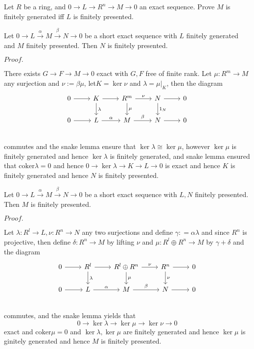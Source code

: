 \documentclass{article}
\newcommand{\Pf}[1]{$Proof.$\par}
\begin{document}
    \begin{proposition}
        Let $R$ be a ring, and $0\to L \to R^n\to M \to 0$ an exact sequence. Prove $M$ is finitely generated iff $L$ is finitely presented.    
    \end{proposition}
    
    \begin{proposition}
        Let $0\to L \overset{\alpha}{\to} M \overset{\beta}{\to} N \to 0$ be a short exact sequence with $L$ finitely generated and $M$ finitely presented. Then $N$ is finitely presented.
    \end{proposition}
    \Pf\par
        There exists $G\to F \to M \to 0$ exact with $G,F$ free of finite rank. Let $\mu:R^m \to M$ any surjection and $\nu:= \beta\mu$, let$K = \ker \nu$ and $\lambda = \mu|_K$, then the diagram
        \[
        \begin{tikzcd}
            0\arrow[r] & K\arrow[r]\arrow[d,"\lambda"] & R^m\arrow[r,"\nu"]\arrow[d,"\mu"] & N\arrow[r]\arrow[d,"1_N"] & 0 \\
            0\arrow[r] & L\arrow[r,"\alpha"] & M\arrow[r,"\beta"] & N\arrow[r] & 0 \\
        \end{tikzcd}
        \]
        commutes and the snake lemma ensure that $\ker\lambda \cong \ker\mu$, however $\ker\mu$ is finitely generated and hence $\ker\lambda$ is finitely generated, and snake lemma ensured that $\text{coker}\lambda = 0$ and hence $0\to \ker\lambda \to K \to L \to 0$ is exact and hence $K$ is finitely generated and hence $N$ is finitely presented.

    \begin{proposition}
        Let $0\to L \overset{\alpha}{\to} M \overset{\beta}{\to} N \to 0$ be a short exact sequence with $L,N$ finitely presented. Then $M$ is finitely presented.
    \end{proposition}
    \Pf\par
        Let $\lambda:R^l \to L, \nu:R^n \to N$ any two surjections and define $\gamma: = \alpha\lambda$ and since $R^n$ is projective, then define $\delta:R^n \to M$ by lifting $\nu$ and $\mu:R^l\oplus R^n \to M$ by $\gamma+\delta$ and the diagram
        \[
        \begin{tikzcd}
            0\arrow[r] & R^l\arrow[r]\arrow[d,"\lambda"] & R^l\oplus R^n\arrow[r,"\nu"]\arrow[d,"\mu"] & R^n\arrow[r]\arrow[d,"\nu"] & 0 \\
            0\arrow[r] & L\arrow[r,"\alpha"] & M\arrow[r,"\beta"] & N\arrow[r] & 0 \\
        \end{tikzcd}
        \]
        commutes, and the snake lemma yields that
        \[0\to \ker \lambda \to \ker\mu \to \ker\nu \to 0\]
        exact and $\text{coker}\mu = 0$ and $\ker\lambda,\ker\mu$ are finitely generated and hence $\ker \mu$ is ginitely generated and hence $M$ is finitely presented.
\end{document}
